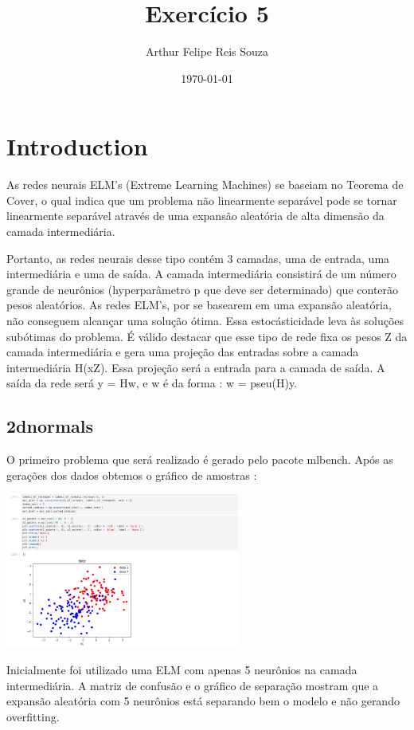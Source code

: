 \documentclass{article}
\begin{document}
\title{Exercício 5} 
\author{Arthur Felipe Reis Souza}
\date{\today}
\maketitle

\section{Introduction}

As redes neurais ELM's (Extreme Learning Machines) se baseiam no Teorema de Cover, o qual indica que um problema não linearmente separável pode se tornar linearmente separável através de uma expansão aleatória de alta dimensão da camada intermediária.

Portanto, as redes neurais desse tipo contém 3 camadas, uma de entrada, uma intermediária e uma de saída. A camada intermediária consistirá de um número grande de neurônios (hyperparâmetro p que deve ser determinado) que conterão pesos aleatórios. As redes ELM's, por se basearem em uma expansão aleatória, não conseguem alcançar uma solução ótima. Essa estocásticidade leva às soluções subótimas do problema. É válido destacar que esse tipo de rede fixa os pesos Z da camada intermediária e gera uma projeção das entradas sobre a camada intermediária H(xZ). Essa projeção será a entrada para a camada de saída. A saída da rede será y = Hw, e w é da forma : w = pseu(H)y.
\vspace{20pt}

\subsection{2dnormals}
O primeiro problema que será realizado é gerado pelo pacote mlbench. Após as gerações dos dados obtemos o gráfico de amostras : 

\begin{center}

\includegraphics[height=2in]{exercise_pic/normals/plot_data_normals.png}

\end{center}
Inicialmente foi utilizado uma ELM com apenas 5 neurônios na camada intermediária. A matriz de confusão e o gráfico de separação mostram que a expansão aleatória com 5 neurônios está separando bem o modelo e não gerando overfitting.
\end{document}
